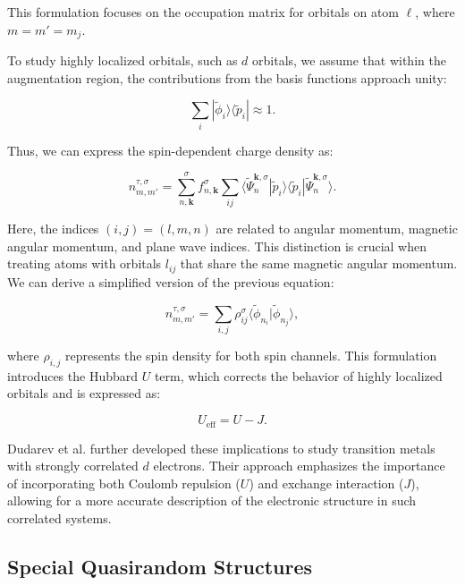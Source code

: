 This formulation focuses on the occupation matrix for orbitals on atom \(\ell\), where \(m = m' = m_j\).  

To study highly localized orbitals, such as \(d\) orbitals, we assume that within the augmentation region, the contributions from the basis functions approach unity:  

\begin{equation}  
	\sum_{i} | \tilde{\phi}_i \rangle \langle \tilde{p}_i | \approx 1.  
\end{equation}  

Thus, we can express the spin-dependent charge density as:  

\begin{equation}  
	n_{m,m'}^{\tau, \sigma} = \sum_{n, \mathbf{k}}^{\sigma} f_{n, \mathbf{k}}^{\sigma} \sum_{ij} \langle \tilde{\Psi}_{n}^{\mathbf{k}, \sigma} | \tilde{p}_i \rangle \langle \tilde{p}_i | \tilde{\Psi}_{n}^{\mathbf{k}, \sigma} \rangle.  
\end{equation}  

Here, the indices \((i,j) = (l,m,n)\) are related to angular momentum, magnetic angular momentum, and plane wave indices. This distinction is crucial when treating atoms with orbitals \(l_{ij}\) that share the same magnetic angular momentum. We can derive a simplified version of the previous equation:  

\begin{equation}  
	n_{m, m'}^{\tau,\sigma} = \sum_{i,j} \rho_{ij}^{\sigma} \langle \tilde{\phi}_{n_i} | \tilde{\phi}_{n_j} \rangle,  
\end{equation}  

where \(\rho_{i,j}\) represents the spin density for both spin channels. This formulation introduces the Hubbard \(U\) term, which corrects the behavior of highly localized orbitals and is expressed as:  

\begin{equation}  
	U_{\text{eff}} = U - J.  
\end{equation}  

Dudarev et al. \supercite{Dudarev1998} further developed these implications to study transition metals with strongly correlated \(d\) electrons. Their approach emphasizes the importance of incorporating both Coulomb repulsion (\(U\)) and exchange interaction (\(J\)), allowing for a more accurate description of the electronic structure in such correlated systems. 


\subsection{Special Quasirandom Structures} \label{sqs}


